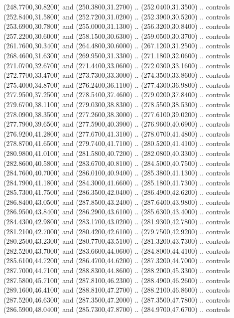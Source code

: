 {\begin{scope}[y=0.80pt, x=0.80pt, yscale=-1, xscale=1, inner sep=0pt, outer sep=0pt, #1]
      (248.7700,30.8200) and (250.3800,31.2700) .. (252.0400,31.3500) .. controls
      (252.8400,31.5800) and (252.7200,31.0200) .. (252.3900,30.5200) .. controls
      (253.6900,30.7800) and (255.0000,31.1300) .. (256.3200,30.8400) .. controls
      (257.2200,30.6000) and (258.1500,30.6300) .. (259.0500,30.3700) .. controls
      (261.7600,30.3400) and (264.4800,30.6000) .. (267.1200,31.2500) .. controls
      (268.4600,31.6300) and (269.9500,31.3300) .. (271.1800,32.0600) .. controls
      (271.0700,32.6700) and (271.4400,33.0600) .. (272.0300,33.1600) .. controls
      (272.7700,33.4700) and (273.7300,33.3000) .. (274.3500,33.8600) .. controls
      (275.4000,34.8700) and (276.2400,36.1100) .. (277.4300,36.9800) .. controls
      (277.9500,37.2500) and (278.5400,37.4600) .. (279.0200,37.8400) .. controls
      (279.6700,38.1100) and (279.0300,38.8300) .. (278.5500,38.5300) .. controls
      (278.0900,38.3500) and (277.2600,38.3000) .. (277.6100,39.0200) .. controls
      (277.7900,39.6500) and (277.5900,40.3900) .. (276.9600,40.6900) .. controls
      (276.9200,41.2800) and (277.6700,41.3100) .. (278.0700,41.4800) .. controls
      (278.8700,41.6500) and (279.7400,41.7100) .. (280.5200,41.4100) .. controls
      (280.9800,41.0100) and (281.5800,40.7200) .. (282.0800,40.3300) .. controls
      (282.8600,40.5800) and (283.6700,40.8100) .. (284.5000,40.7500) .. controls
      (284.7600,40.7000) and (286.0100,40.9400) .. (285.3800,41.1300) .. controls
      (284.7900,41.1800) and (284.3000,41.6600) .. (285.1800,41.7300) .. controls
      (285.7300,41.7500) and (286.3500,42.0400) .. (286.4900,42.6200) .. controls
      (286.8400,43.0500) and (287.8500,43.2400) .. (287.6400,43.9800) .. controls
      (286.9500,43.8400) and (286.2900,43.6100) .. (285.6300,43.4000) .. controls
      (284.4300,42.9800) and (283.1700,43.0200) .. (281.9300,42.7800) .. controls
      (281.2100,42.7000) and (280.4200,42.6100) .. (279.7500,42.9200) .. controls
      (280.2500,43.2300) and (280.7700,43.5100) .. (281.3200,43.7300) .. controls
      (282.5200,43.7000) and (283.6600,44.0600) .. (284.8000,44.4100) .. controls
      (285.6100,44.7200) and (286.4700,44.6200) .. (287.3200,44.7000) .. controls
      (287.7000,44.7100) and (288.8300,44.8600) .. (288.2000,45.3300) .. controls
      (287.5800,45.7100) and (287.8100,46.2300) .. (288.4900,46.2600) .. controls
      (289.1600,46.4100) and (288.8100,47.2700) .. (288.2100,46.8600) .. controls
      (287.5200,46.6300) and (287.3500,47.2000) .. (287.3500,47.7800) .. controls
      (286.5900,48.0400) and (285.7300,47.8700) .. (284.9700,47.6700) .. controls

\end{scope}}
